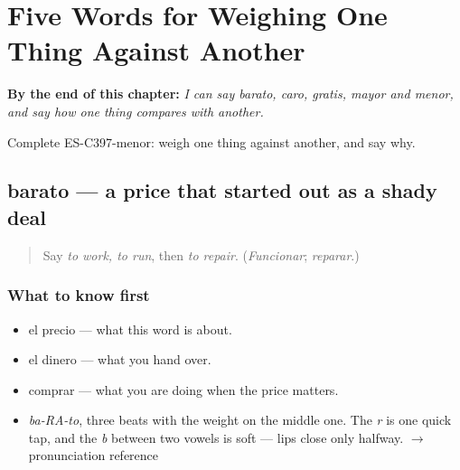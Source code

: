 
\chapter{Five Words for Weighing One Thing Against Another}
\label{ch:barato-y-caro}

\begin{chapteropening}
\textbf{By the end of this chapter:} \emph{I can say barato, caro, gratis, mayor and menor, and say how one thing compares with another.}

Complete ES-C397-menor: weigh one thing against another, and say why.
\end{chapteropening}

\section[barato]{barato — a price that started out as a shady deal}

\label{lesson:ES-C397-barato}



\begin{quote}
Say \emph{to work, to run}, then \emph{to repair}. (\emph{Funcionar}; \emph{reparar}.)
\end{quote}

\subsection*{What to know first}
\begin{itemize}
\raggedright
  \item el precio — what this word is about.
  \item el dinero — what you hand over.
  \item comprar — what you are doing when the price matters.
\end{itemize}

\begin{sounds}
\begin{itemize}
\raggedright
  \item \emph{ba-RA-to}, three beats with the weight on the middle one. The \emph{r} is one quick tap, and the \emph{b} between two vowels is soft — lips close only halfway. $\to$ pronunciation reference
\end{itemize}
\end{sounds}

